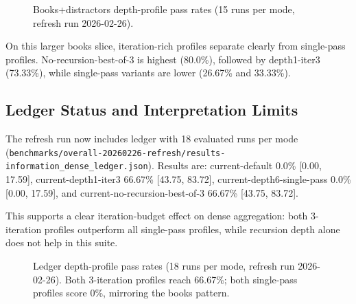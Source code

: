 \documentclass[11pt]{article}
\begin{document}
\begin{figure}[t]
\centering
{}
\caption{Books+distractors depth-profile pass rates (15 runs per mode, refresh run 2026-02-26).}
\label{fig:books-depth-bars}
\end{figure}

On this larger books slice, iteration-rich profiles separate clearly from single-pass profiles. No-recursion-best-of-3 is highest (80.0\%), followed by depth1-iter3 (73.33\%), while single-pass variants are lower (26.67\% and 33.33\%).

\subsection{Ledger Status and Interpretation Limits}
The refresh run now includes ledger with 18 evaluated runs per mode (\texttt{benchmarks/overall-20260226-refresh/results-information\_dense\_ledger.json}). Results are: current-default 0.0\% [0.00, 17.59], current-depth1-iter3 66.67\% [43.75, 83.72], current-depth6-single-pass 0.0\% [0.00, 17.59], and current-no-recursion-best-of-3 66.67\% [43.75, 83.72].

This supports a clear iteration-budget effect on dense aggregation: both 3-iteration profiles outperform all single-pass profiles, while recursion depth alone does not help in this suite.

\begin{figure}[t]
\centering
{}
\caption{Ledger depth-profile pass rates (18 runs per mode, refresh run 2026-02-26). Both 3-iteration profiles reach 66.67\%; both single-pass profiles score 0\%, mirroring the books pattern.}
\label{fig:ledger-depth-bars}
\end{figure}
\end{document}
